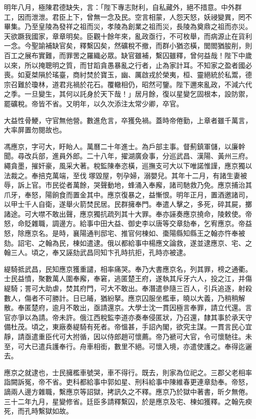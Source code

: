 \begin{pinyinscope}
明年八月，極陳君德缺失，言：「陛下專志財利，自私藏外，絕不措意。中外群工，因而泄泄。君臣上下，曾無一念及民。空言相蒙，人怨天怒，妖祲變異，罔不畢集。乃至皇陵為發祥之祖而災，孝陵為創業之祖而災，長陵為奠鼎之祖而亦災。天欲蹶我國家，章章明矣。臣觀十餘年來，亂政亟行，不可枚舉，而病源止在貨利一念。今聖諭補缺官矣，釋繫囚矣，然礦稅不撤，而群小猶恣橫，閭閻猶朘削，則百工之展布實難，而罪罟之羅織必眾。缺官雖補，繫囚雖釋，曾何益哉！陛下中歲以來，所以掩聰明之質，而甘蹈貪愚暴亂之行者，止為家計耳。不知家之盈者國必喪。如夏桀隕於瑤臺，商紂焚於寶玉，幽、厲啟戎於榮夷，桓、靈絕統於私鬻，德宗召難於瓊林，道君兆禍於花石。覆轍相仍，昭然可鑒。陛下邇來亂政，不減六代之季。一旦變生，其何以託身於天下哉！」居月餘，復以星變乞固根本，設防禦，罷礦稅。帝皆不省。又明年，以久次添注太常少卿，卒官。

大益性骨鯁，守官無他營。數進危言，卒獲免禍。蓋時帝倦勤，上章者雖千萬言，大率屏置勿閱故也。

馮應京，字可大，盱眙人。萬曆二十年進士。為戶部主事。督薊鎮軍儲，以廉幹聞。尋改兵部，進員外郎。二十八年，擢湖廣僉事，分巡武昌、漢陽、黃州三府。繩貪墨，摧奸豪，風采大著。稅監陳奉恣橫，巡撫支可大以下唯諾惟謹，應京獨以法裁之。奉掊克萬端，至伐塚毀屋，刳孕婦，溺嬰兒。其年十二月，有諸生妻被辱，訴上官。市民從者萬餘，哭聲動地，蜂涌入奉廨，諸司馳救乃免。應京捕治其爪牙，奉怒，陽餉食而置金其中。應京復暴之，益慚恨。明年正月，置酒邀諸司，以甲士千人自衛，遂舉火箭焚民居。民群擁奉門。奉遣人擊之，多死，碎其屍，擲諸途。可大噤不敢出聲，應京獨抗疏列其十大罪。奉亦誣奏應京撓命，陵敕使。帝怒，命貶雜職，調邊方。給事中田大益、御史李以唐等交章劾奉，乞宥應京。帝益怒，除應京名。是時，襄陽通判邸宅、推官何棟如、棗陽縣知縣王之翰亦忤奉被劾。詔宅、之翰為民，棟如遣逮。俄以都給事中楊應文論救，遂並逮應京、宅、之翰三人。頃之，奉又誣劾武昌同知卞孔時抗拒，孔時亦被逮。

緹騎抵武昌，民知應京獲重譴，相率痛哭。奉乃大書應京名，列其罪，榜之通衢。士民益憤，聚數萬人圍奉廨，奉窘，逃匿楚王府，遂執其斥牙六人，投之江，并傷緹騎；詈可大助虐，焚其府門，可大不敢出。奉潛遣參隨三百人，引兵追逐，射殺數人，傷者不可勝計。日已晡，猶紛拏。應京囚服坐檻車，曉以大義，乃稍稍解散。奉匿楚府，逾月不敢出，亟請還京。大學士沈一貫因極言奉罪，請立代還。言官亦爭以為請。帝未許。俄江西稅監李道亦奏奉侵匿狀，乃召還，隸其事於承天守備杜茂。頃之，東廠奏緹騎有死者。帝慍甚，手詔內閣，欲究主謀。一貫言民心宜靜，請亟遣重臣代可大拊循，因以侍郎趙可懷薦。帝乃褫可大官，令可懷馳往。未至，可大已遣兵護奉行。舟車相銜，數里不絕。可懷入境，亦遣使護之。奉得迄邐去。

應京之就逮也，士民擁檻車號哭，車不得行。既去，則家為位祀之。三郡父老相率詣闕訴冤，帝不省。吏科都給事中郭如星、刑科給事中陳維春更連章劾奉。帝怒，謫兩人邊方雜職，繫應京等詔獄，拷訊久之不釋。應京乃於獄中著書，昕夕無倦。三十二年九月，星變修省。廷臣多請釋繫囚，於是應京及宅、棟如獲釋。之翰先瘐死，而孔時繫獄如故。


\end{pinyinscope}
